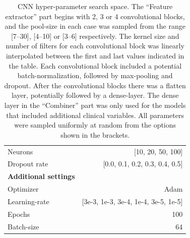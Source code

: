 \documentclass[preprint]{elsarticle}
\begin{document}
\begin{table}[H]
\begin{adjustbox}{center}
\begin{tabular}{@{}lr@{}}
{Neurons}                   & [10, 20, 50, 100] \\
{Dropout rate}                  & [0.0, 0.1, 0.2, 0.3, 0.4, 0.5] \\
\midrule
\textbf{Additional settings} & \\
\midrule
Optimizer                   & Adam \\
Learning-rate               & [3e-3, 1e-3, 3e-4, 1e-4, 3e-5, 1e-5] \\
Epochs                      & 100 \\
Batch-size                  & 64 \\

\bottomrule
\end{tabular}
\end{adjustbox}
\caption{CNN hyper-parameter search space. The ``Feature extractor'' part begins with 2, 3 or 4 convolutional blocks, and the pool-size in each case was sampled from the range [7--30], [4--10] or [3--6] respectively. The kernel size and number of filters for each convolutional block was linearly interpolated between the first and last values indicated in the table. Each convolutional block included a potential batch-normalization, followed by max-pooling and dropout. After the convolutional blocks there was a flatten layer, potentially followed by a dense-layer. The dense layer in the ``Combiner'' part was only used for the models that included additional clinical variables. All parameters were sampled uniformly at random from the options shown in the brackets.}
\label{table:cnn}
\end{table}

\end{document}
